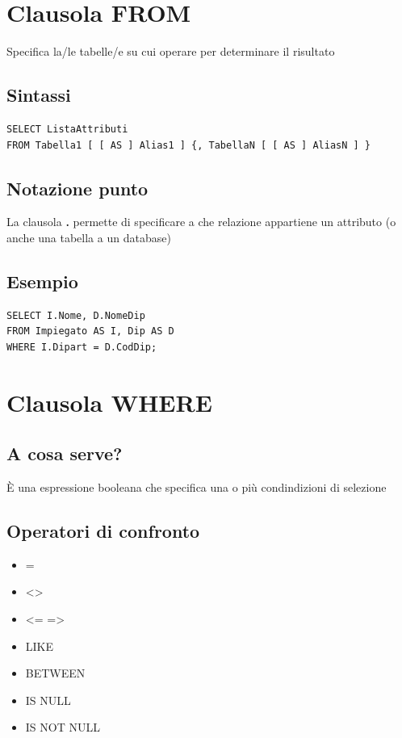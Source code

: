 \section{Clausola FROM}
Specifica la/le tabelle/e su cui operare per determinare il risultato

\subsection{Sintassi}
\begin{lstlisting}[language=sql_generic]
SELECT ListaAttributi
FROM Tabella1 [ [ AS ] Alias1 ] {, TabellaN [ [ AS ] AliasN ] }
\end{lstlisting}

\subsection{Notazione punto}
La clausola \textbf{.} permette di specificare a che relazione appartiene un attributo (o anche una tabella a un database)

\subsection{Esempio}
\begin{lstlisting}[language=sql_generic]
SELECT I.Nome, D.NomeDip
FROM Impiegato AS I, Dip AS D
WHERE I.Dipart = D.CodDip;
\end{lstlisting}

\section{Clausola WHERE}
\subsection{A cosa serve?}
È una espressione booleana che specifica una o più condindizioni di selezione

\subsection{Operatori di confronto}
\begin{itemize}
    \item =
    \item <>
    \item <= =>
    \item LIKE
    \item BETWEEN
    \item IS NULL
    \item IS NOT NULL
\end{itemize}

